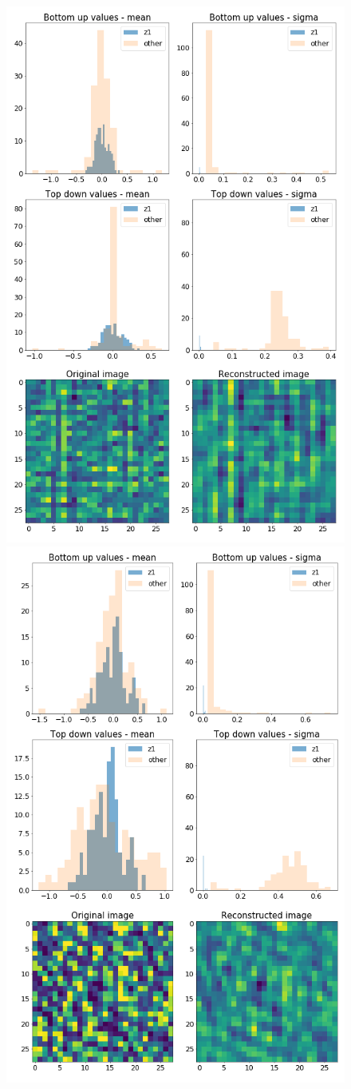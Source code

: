 \documentclass[12pt, english]{article}
\begin{document}
\begin{figure}[H]
  \begin{minipage}[b]{0.5\linewidth}
    \centering
    \includegraphics[width=.6\linewidth]{z1_vis/z1_vis_contrast_no_norm/15_DenseLinLinLadderVAE_textures_noContrastNorm_contrast-stats-1_TD_BU_COMPS_1.png}
  \end{minipage}
  \begin{minipage}[b]{0.5\linewidth}
    \centering
    \includegraphics[width=.6\linewidth]{z1_vis/z1_vis_contrast_no_norm/15_DenseLinLinLadderVAE_textures_noContrastNorm_contrast-stats-2_TD_BU_COMPS_1.png} 
  \end{minipage}


\end{figure}
\end{document}
